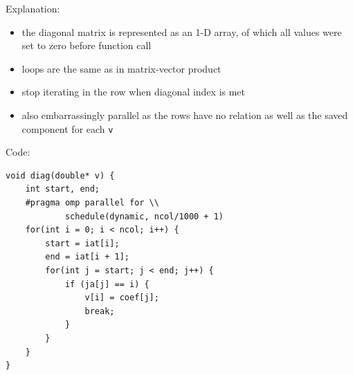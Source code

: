 \documentclass{article}
\begin{document}
\begin{minipage}[t]{0.45\textwidth}
Explanation:
\begin{itemize}
    \item the diagonal matrix is represented as an 1-D array, of which all values were set to zero before function call 
    \item loops are the same as in matrix-vector product
    \item stop iterating in the row when diagonal index is met
    \item also embarrassingly parallel as the rows have no relation as well as the saved component for each \lstinline|v|
\end{itemize}
\end{minipage}
\hspace{0.7cm}
\begin{minipage}[t]{0.35\textwidth}
Code:
\begin{verbatim}
void diag(double* v) {
    int start, end;
    #pragma omp parallel for \\
            schedule(dynamic, ncol/1000 + 1)
    for(int i = 0; i < ncol; i++) {
        start = iat[i];
        end = iat[i + 1];
        for(int j = start; j < end; j++) {
            if (ja[j] == i) {
                v[i] = coef[j];
                break;
            }
        }
    }
}


\end{verbatim}
\end{minipage}
\end{document}
